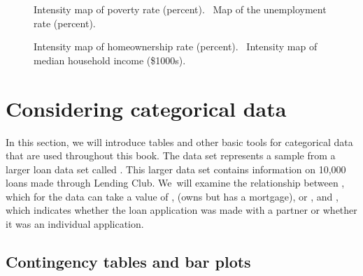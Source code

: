 \begin{figure}
  \centering
  \caption{ Intensity map of
      poverty rate (percent).
      ~Map of the
      unemployment rate (percent).}
  \label{countyIntensityMaps1}
\end{figure}

\begin{figure}
  \centering
  \caption{ Intensity map
      of homeownership rate (percent).
      ~Intensity map of median
      household income (\$1000s).}
\label{countyIntensityMaps2}
\end{figure}



{}




\section{Considering categorical data}
\label{categoricalData}


In this section, we will introduce tables and other basic tools
for categorical data that are used throughout this book.
The  data set represents a sample from a larger
loan data set called .
This larger data set contains information on 10,000 loans made
through Lending Club.
We~will examine the relationship between
, which for the  data can take
a value of , 
(owns but has a mortgage), or ,
and ,
which indicates whether the loan application was made
with a partner or whether it was an individual application.


\subsection{Contingency tables and bar plots}


